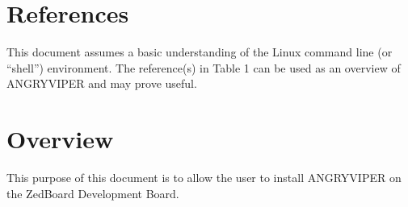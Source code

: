 \newpage

\tableofcontents

\newpage

\section{References}
	This document assumes a basic understanding of the Linux command line (or ``shell'') environment.  The reference(s) in Table 1 can be used as an overview of ANGRYVIPER and may prove useful.
\def\refskipocpiov{}
\def\refcapbottom{}


\newpage
\section{Overview}
This purpose of this document is to allow the user to install ANGRYVIPER on the ZedBoard Development Board.
